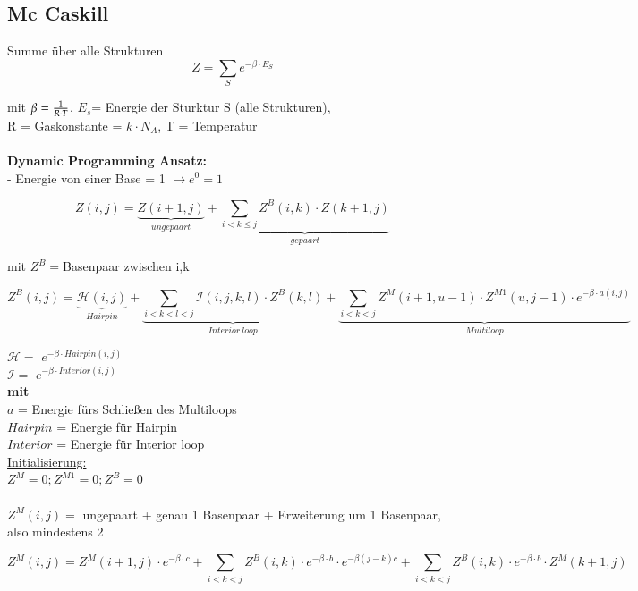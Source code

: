 \subsection{Mc Caskill}

Summe über alle Strukturen 
\begin{equation}
	Z=\sum\limits_{S} e^{-\beta \cdot E_{S}}
\end{equation}

mit $\beta= {1 \over {R \cdot T}}$, $E_{s}$= Energie der Sturktur S (alle Strukturen),\\ R = Gaskonstante = $k \cdot N_{A}$, T = Temperatur
\\\\
\textbf{Dynamic Programming Ansatz:}\\
 - Energie von einer Base = 1 $\rightarrow e^0=1$

\begin{equation}
	Z(i,j)= \underbrace{Z(i+1,j)}_{ungepaart} + \underbrace{\sum\limits_{i < k \leq j} Z^{B}(i,k) \cdot Z(k+1,j)}_{gepaart}
\end{equation}

mit $Z^B=$Basenpaar zwischen i,k

\begin{equation}
Z^B(i,j)= \underbrace{\mathcal{H}(i,j)}_{Hairpin} + \underbrace{\sum\limits_{i < k < l < j} \mathcal{I}(i,j, k, l) \cdot Z^B(k,l)}_{Interior~loop} +  \underbrace{\sum\limits_{i < k < j} Z^M(i+1,u-1) \cdot Z^{M1}(u,j-1) \cdot e^{-\beta \cdot {a(i,j)}}}_{Multiloop}
\end{equation}

$\mathcal{H}=$ $e^{-\beta \cdot Hairpin(i,j)}$\\
$\mathcal{I}=$ $e^{-\beta \cdot Interior(i,j)}$\\
\textbf{mit}\\
$a$ = Energie fürs Schließen des Multiloops\\
$Hairpin$ = Energie für Hairpin\\
$Interior$ = Energie für Interior loop\\


\underline{Initialisierung:}\\
$Z^M=0; Z^{M1}=0; Z^B=0$
\\\\
$Z^M(i,j) =$ ungepaart + genau 1 Basenpaar + Erweiterung um 1 Basenpaar, also mindestens 2

\begin{equation}
	Z^M(i,j) = Z^M(i+1,j) \cdot e^{-\beta \cdot c} + \sum\limits_{i < k < j} Z^B(i,k) \cdot e^{-\beta \cdot b} \cdot e^{-\beta(j-k)c} + \sum\limits_{i < k < j} Z^B(i,k) \cdot e^{-\beta \cdot b} \cdot Z^M(k+1,j)
\end{equation}

